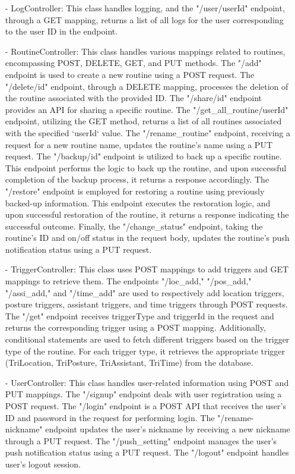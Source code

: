 \begin{enumerate}[label=\arabic*]
\begin{enumerate}[label=\alph*]
\begin{enumerate}
                \item[-] LogController: This class handles logging, and the "/user/{userId}" endpoint, through a GET mapping, returns a list of all logs for the user corresponding to the user ID in the endpoint. \\
                \item[-] RoutineController: This class handles various mappings related to routines, encompassing POST, DELETE, GET, and PUT methods. The "/add" endpoint is used to create a new routine using a POST request. The "/delete/{id}" endpoint, through a DELETE mapping, processes the deletion of the routine associated with the provided ID. The "/share/{id}" endpoint provides an API for sharing a specific routine. The "/get\_all\_routine/{userId}" endpoint, utilizing the GET method, returns a list of all routines associated with the specified `{userId}` value. The "/rename\_routine" endpoint, receiving a request for a new routine name, updates the routine's name using a PUT request. The "/backup/{id}" endpoint is utilized to back up a specific routine. This endpoint performs the logic to back up the routine, and upon successful completion of the backup process, it returns a response accordingly. The "/restore" endpoint is employed for restoring a routine using previously backed-up information. This endpoint executes the restoration logic, and upon successful restoration of the routine, it returns a response indicating the successful outcome. Finally, the "/change\_status" endpoint, taking the routine's ID and on/off status in the request body, updates the routine's push notification status using a PUT request. \\
                \item[-] TriggerController: This class uses POST mappings to add triggers and GET mappings to retrieve them. The endpoints "/loc\_add," "/pos\_add," "/assi\_add," and "/time\_add" are used to respectively add location triggers, posture triggers, assistant triggers, and time triggers through POST requests. The "/get" endpoint receives triggerType and triggerId in the request and returns the corresponding trigger using a POST mapping. Additionally, conditional statements are used to fetch different triggers based on the trigger type of the routine. For each trigger type, it retrieves the appropriate trigger (TriLocation, TriPosture, TriAssistant, TriTime) from the database. \\
                \item[-] UserController: This class handles user-related information using POST and PUT mappings. The "/signup" endpoint deals with user registration using a POST request. The "/login" endpoint is a POST API that receives the user's ID and password in the request for performing login. The "/rename-nickname" endpoint updates the user's nickname by receiving a new nickname through a PUT request. The "/push\_setting" endpoint manages the user's push notification status using a PUT request. The "/logout" endpoint handles user's logout session.\\

\end{enumerate}
\end{enumerate}
\end{enumerate}
